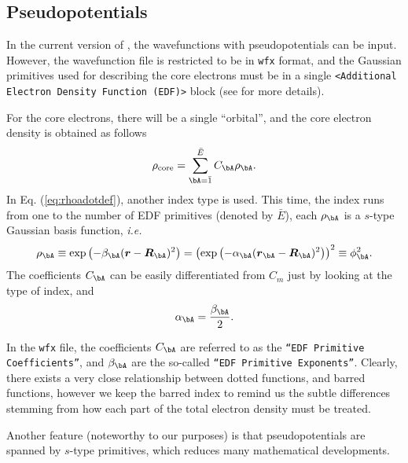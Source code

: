 \subsection*{Pseudopotentials}

In the current version of \DTK{}, the wavefunctions with pseudopotentials can be
input. However, the wavefunction file is restricted to be in \texttt{wfx} format,
and the Gaussian primitives used for describing the core electrons must be in a
single \texttt{<Additional Electron Density Function (EDF)>} block (see
\cite{bib:webwfxformat} for more details).

For the core electrons, there will be a single ``orbital'', and the core electron
density  is obtained as follows
%
\begin{equation}\label{eq:rhoadotdef}
  \rho_{\textrm{core}}=\sum_{\bA=\bar 1}^{\bar E}C_{\bA}\rho_{\bA}.
\end{equation}
%
In Eq. (\ref{eq:rhoadotdef}), another index type is used. This time, the index runs
from one to the number of EDF primitives (denoted by $\bar E$), 
each $\rho_{\bA}$ is a $s$-type Gaussian basis
function, \textit{i.e.}
%
\begin{equation}%
  \rho_{\bA}\equiv\exp\left( -\beta_{\bA}(\boldsymbol r-\boldsymbol R_{\bA})^2 \right)
  =\left( \exp\left( -\alpha_{\bA}(\boldsymbol r_{\bA}-\boldsymbol R_{\bA})^2 \right) \right)^2
  \equiv\phi_{\bA}^2.
\end{equation}
%
The coefficients $C_{\bA}$ can be easily differentiated from $C_m$ just by
looking at the type of index, and 
%
\begin{equation}%
  \alpha_{\bA}=\frac{\beta_{\bA}}{2}.
\end{equation}
%


In the \texttt{wfx} file, the coefficients $C_{\bA}$ are referred to as the
\texttt{``EDF Primitive Coefficients''}, and $\beta_{\bA}$ are the so-called
\texttt{``EDF Primitive Exponents''}.
Clearly, there exists a very close relationship between dotted functions, and barred
functions, however we keep the barred index to remind us the subtle differences 
stemming from how each part of the total electron density must be treated.

Another feature (noteworthy to our purposes) is that pseudopotentials are 
spanned by $s$-type primitives, which reduces many mathematical developments.



